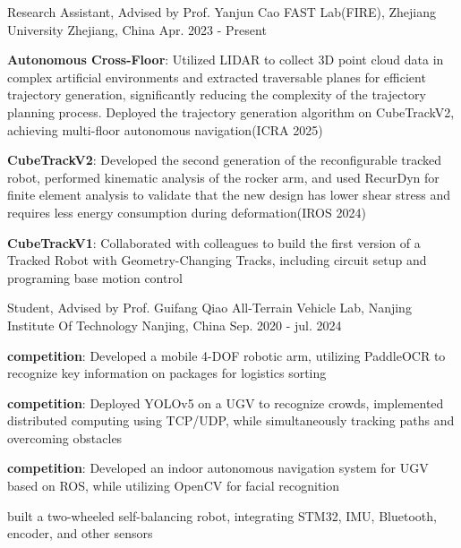 

\begin{cventries}

  \cventry
    {Research Assistant, Advised by Prof. Yanjun Cao} %
    {FAST Lab(FIRE), Zhejiang University} %
    {Zhejiang, China} %
    {Apr. 2023 - Present} %
    {
      \begin{cvitems} %
        \item {\textbf{Autonomous Cross-Floor}: Utilized LIDAR to collect 3D point cloud data in complex artificial environments and extracted traversable planes for efficient trajectory generation, significantly reducing the complexity of the trajectory planning process. Deployed the trajectory generation algorithm on CubeTrackV2, achieving multi-floor autonomous navigation(ICRA 2025)}
        \item {\textbf{CubeTrackV2}: Developed the second generation of the reconfigurable tracked robot, performed kinematic analysis of the rocker arm, and used RecurDyn for finite element analysis to validate that the new design has lower shear stress and requires less energy consumption during deformation(IROS 2024)}
        \item {\textbf{CubeTrackV1}: Collaborated with colleagues to build the first version of a Tracked Robot with Geometry-Changing Tracks, including circuit setup and programing base motion control}
       \end{cvitems}
    }
    
\vspace{0.8cm}
  \cventry
    {Student, Advised by Prof. Guifang Qiao} %
    {All-Terrain Vehicle Lab, Nanjing Institute Of Technology} %
    {Nanjing, China} %
    {Sep. 2020 - jul. 2024} %
    {
      \begin{cvitems} %
        \item {\textbf{competition}: Developed a mobile 4-DOF robotic arm, utilizing PaddleOCR to recognize key information on packages for logistics sorting}
        \item {\textbf{competition}: Deployed YOLOv5 on a UGV to recognize crowds, implemented distributed computing using TCP/UDP, while simultaneously tracking paths and overcoming obstacles}
        \item {\textbf{competition}: Developed an indoor autonomous navigation system for UGV based on ROS, while utilizing OpenCV for facial recognition}
        \item {built a two-wheeled self-balancing robot, integrating STM32, IMU, Bluetooth, encoder, and other sensors}
      \end{cvitems}
    }

\end{cventries}
\vspace{1.2cm}

